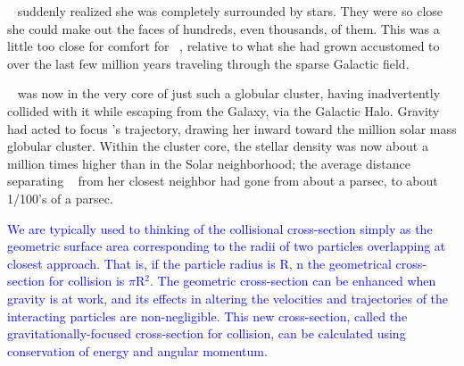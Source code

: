\documentclass[main.tex]{subfiles}
\begin{document}
\par \nar \rmsterope~ suddenly realized she was completely surrounded by stars.  They were so close she could make out the faces of hundreds, even thousands, of them.  This was a little too close for comfort for \rmsterope~, relative to what she had grown accustomed to over the last few million years traveling through the sparse Galactic field.  

\par \nar \rmsterope~ was now in the very core of just such a globular cluster, having inadvertently collided with it while escaping from the Galaxy, via the Galactic Halo.  Gravity had acted to focus \rmsterope's trajectory, drawing her inward toward the million solar mass globular cluster.  Within the cluster core, the stellar density was now about a million times higher than in the Solar neighborhood; the average distance separating \rmsterope~ from her closest neighbor had gone from about a parsec, to about 1/100's of a parsec.  

\begin{tcolorbox}[sharp corners, colback=blue!30, colframe=blue!80!blue, title=Gravitational Focusing I]
\par \textcolor{blue} {We are typically used to thinking of the collisional cross-section simply as the geometric surface area corresponding to the radii of two particles overlapping at closest approach.  That is, if the particle radius is R, n the geometrical cross-section for collision is $\pi$R$^2$.  The geometric cross-section can be enhanced when gravity is at work, and its effects in altering the velocities and trajectories of the interacting particles are non-negligible.  This new cross-section, called the gravitationally-focused cross-section for collision, can be calculated using conservation of energy and angular momentum. }
\end{tcolorbox} 
\end{document}
